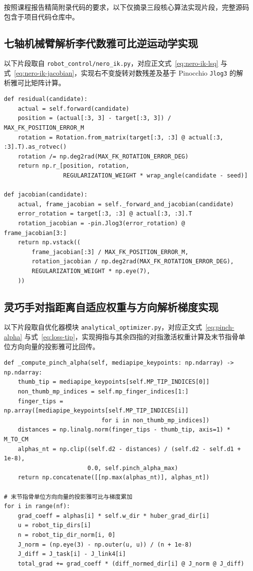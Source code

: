 按照课程报告精简附录代码的要求，以下仅摘录三段核心算法实现片段，完整源码包含于项目代码仓库中。

\subsection{七轴机械臂解析李代数雅可比逆运动学实现}

以下片段取自 \texttt{robot\_control/nero\_ik.py}，对应正文式~\eqref{eq:nero-ik-lsq} 与式~\eqref{eq:nero-ik-jacobian}，实现右不变旋转对数残差及基于 Pinocchio \texttt{Jlog3} 的解析雅可比矩阵计算。

\begin{lstlisting}[caption={七轴逆运动学加权残差与解析雅可比计算片段}]
def residual(candidate):
    actual = self.forward(candidate)
    position = (actual[:3, 3] - target[:3, 3]) / MAX_FK_POSITION_ERROR_M
    rotation = Rotation.from_matrix(target[:3, :3] @ actual[:3, :3].T).as_rotvec()
    rotation /= np.deg2rad(MAX_FK_ROTATION_ERROR_DEG)
    return np.r_[position, rotation,
                 REGULARIZATION_WEIGHT * wrap_angle(candidate - seed)]

def jacobian(candidate):
    actual, frame_jacobian = self._forward_and_jacobian(candidate)
    error_rotation = target[:3, :3] @ actual[:3, :3].T
    rotation_jacobian = -pin.Jlog3(error_rotation) @ frame_jacobian[3:]
    return np.vstack((
        frame_jacobian[:3] / MAX_FK_POSITION_ERROR_M,
        rotation_jacobian / np.deg2rad(MAX_FK_ROTATION_ERROR_DEG),
        REGULARIZATION_WEIGHT * np.eye(7),
    ))
\end{lstlisting}

\subsection{灵巧手对指距离自适应权重与方向解析梯度实现}

以下片段取自优化器模块 \texttt{analytical\_optimizer.py}，对应正文式~\eqref{eq:pinch-alpha} 与式~\eqref{eq:loss-tip}，实现拇指与其余四指的对指激活权重计算及末节指骨单位方向向量的投影雅可比回传。

\begin{lstlisting}[caption={对指自适应激活权重与末节单位向量解析梯度计算片段}]
def _compute_pinch_alpha(self, mediapipe_keypoints: np.ndarray) -> np.ndarray:
    thumb_tip = mediapipe_keypoints[self.MP_TIP_INDICES[0]]
    non_thumb_mp_indices = self.mp_finger_indices[1:]
    finger_tips = np.array([mediapipe_keypoints[self.MP_TIP_INDICES[i]]
                            for i in non_thumb_mp_indices])
    distances = np.linalg.norm(finger_tips - thumb_tip, axis=1) * M_TO_CM
    alphas_nt = np.clip((self.d2 - distances) / (self.d2 - self.d1 + 1e-8),
                        0.0, self.pinch_alpha_max)
    return np.concatenate([[np.max(alphas_nt)], alphas_nt])

# 末节指骨单位方向向量的投影雅可比与梯度累加
for i in range(nf):
    grad_coeff = alphas[i] * self.w_dir * huber_grad_dir[i]
    u = robot_tip_dirs[i]
    n = robot_tip_dir_norm[i, 0]
    J_norm = (np.eye(3) - np.outer(u, u)) / (n + 1e-8)
    J_diff = J_task[i] - J_link4[i]
    total_grad += grad_coeff * (diff_normed_dir[i] @ J_norm @ J_diff)
\end{lstlisting}

